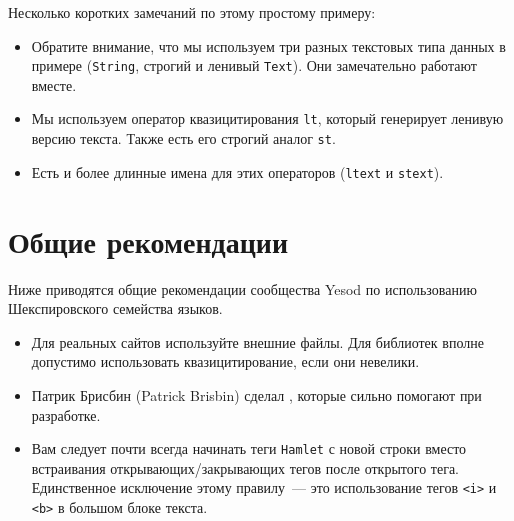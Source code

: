 Несколько коротких замечаний по этому простому примеру:
\begin{itemize}
    \item Обратите внимание, что мы используем три разных текстовых типа данных
        в примере (\lstinline'String', строгий и ленивый \lstinline'Text'). Они
        замечательно работают вместе.

    \item Мы используем оператор квазицитирования \lstinline'lt', который
        генерирует ленивую версию текста. Также есть его строгий аналог
        \lstinline'st'.

    \item Есть и более длинные имена для этих операторов (\lstinline'ltext' и
        \lstinline'stext').
\end{itemize}

\section{Общие рекомендации}
Ниже приводятся общие рекомендации сообщества Yesod по использованию
Шекспировского семейства языков.

\begin{itemize}
    \item Для реальных сайтов используйте внешние файлы. Для библиотек вполне
        допустимо использовать квазицитирование, если они невелики.

    \item Патрик Брисбин (Patrick Brisbin) сделал
        ,
        которые сильно помогают при разработке.

    \item Вам следует почти всегда начинать теги \texttt{Hamlet} с новой строки
        вместо встраивания открывающих/закрывающих тегов после открытого тега.
        Единственное исключение этому правилу~--- это использование тегов
        \lstinline'<i>' и \lstinline'<b>' в большом блоке текста.
\end{itemize}
